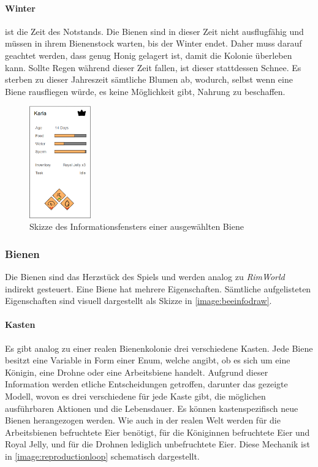 \paragraph{Winter} ist die Zeit des Notstands. Die Bienen sind in dieser Zeit nicht ausflugfähig und müssen in ihrem Bienenstock warten, bis der Winter endet. Daher muss darauf geachtet werden, dass genug Honig gelagert ist, damit die Kolonie überleben kann. Sollte Regen während dieser Zeit fallen, ist dieser stattdessen Schnee. Es sterben zu dieser Jahreszeit sämtliche Blumen ab, wodurch, selbst wenn eine Biene rausfliegen würde, es keine Möglichkeit gibt, Nahrung zu beschaffen.


\begin{figure}
    \begin{center}
        \includegraphics[width=100px]{0.bilder/beeinfodraw.PNG}
    \end{center}
    \caption{Skizze des Informationsfensters einer ausgewählten Biene} \label{image:beeinfodraw}
\end{figure}

\subsubsection{Bienen}
Die Bienen sind das Herzstück des Spiels und werden analog zu \textit{RimWorld} indirekt gesteuert. Eine Biene hat mehrere Eigenschaften. Sämtliche aufgelisteten Eigenschaften sind visuell dargestellt als Skizze in \autoref{image:beeinfodraw}.

\paragraph{Kasten}
Es gibt analog zu einer realen Bienenkolonie drei verschiedene Kasten. Jede Biene besitzt eine Variable in Form einer Enum, welche angibt, ob es sich um eine Königin, eine Drohne oder eine Arbeitsbiene handelt. Aufgrund dieser Information werden etliche Entscheidungen getroffen, darunter das gezeigte Modell, wovon es drei verschiedene für jede Kaste gibt, die möglichen ausführbaren Aktionen und die Lebensdauer. Es können kastenspezifisch neue Bienen herangezogen werden. Wie auch in der realen Welt werden für die Arbeitsbienen befruchtete Eier benötigt, für die Königinnen befruchtete Eier und Royal Jelly, und für die Drohnen lediglich unbefruchtete Eier. Diese Mechanik ist in \autoref{image:reproductionloop} schematisch dargestellt.

